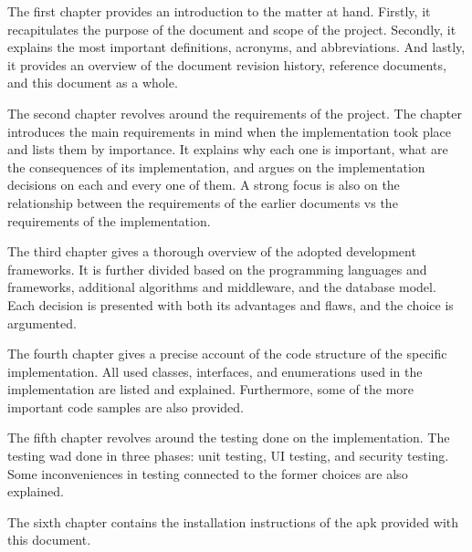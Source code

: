 The first chapter provides an introduction to the matter at hand. Firstly, it recapitulates the purpose of the document and scope of the project. Secondly, it explains the most important definitions, acronyms, and abbreviations. And lastly, it provides an overview of the document revision history, reference documents, and this document as a whole.\newline

The second chapter revolves around the requirements of the project. The chapter introduces the main requirements in mind when the implementation took place and lists them by importance. It explains why each one is important, what are the consequences of its implementation, and argues on the implementation decisions on each and every one of them. A strong focus is also on the relationship between the requirements of the earlier documents vs the requirements of the implementation.\newline

The third chapter gives a thorough overview of the adopted development frameworks. It is further divided based on the programming languages and frameworks, additional algorithms and middleware, and the database model. Each decision is presented with both its advantages and flaws, and the choice is argumented.\newline

The fourth chapter gives a precise account of the code structure of the specific implementation. All used classes, interfaces, and enumerations used in the implementation are listed and explained. Furthermore, some of the more important code samples are also provided.\newline

The fifth chapter revolves around the testing done on the implementation. The testing wad done in three phases: unit testing, UI testing, and security testing. Some inconveniences in testing connected to the former choices are also explained.\newline

The sixth chapter contains the installation instructions of the apk provided with this document.

